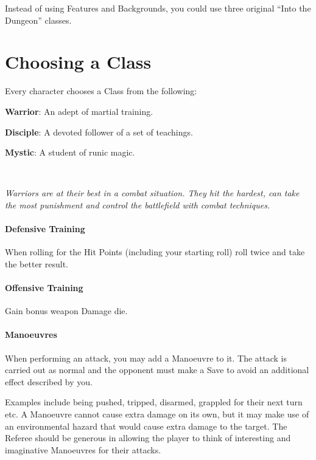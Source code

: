 \documentclass[itdr]{subfiles}
\begin{document}
	
\cleartoleftpage


Instead of using Features and Backgrounds, you could use three original ``Into the Dungeon'' classes.

\section{Choosing a Class}

Every character chooses a Class from the following:

\textbf{Warrior}: An adept of martial training.

\textbf{Disciple}: A devoted follower of a set of teachings.

\textbf{Mystic}: A student of runic magic.

~

{\em Warriors are at their best in a combat situation. They hit the hardest, can take the most punishment and control the battlefield with combat techniques.}

\paragraph{Defensive Training}
When rolling for the Hit Points (including your starting roll) roll twice and take the better result.

\paragraph{Offensive Training}
Gain bonus weapon Damage die.

\paragraph{Manoeuvres}
When performing an attack, you may add a Manoeuvre to it. The attack is carried out as normal and the opponent must make a Save to avoid an additional effect described by you.

Examples include being pushed, tripped, disarmed, grappled for their next turn etc. A Manoeuvre cannot cause extra damage on its own, but it may make use of an environmental hazard that would cause extra damage to the target. The Referee should be generous in allowing the player to think of interesting and imaginative Manoeuvres for their attacks.

\vfill
\break
\end{document}
